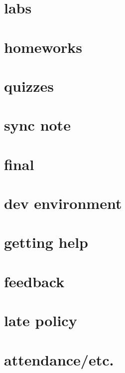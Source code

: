 \section{labs}


\section{homeworks}


\section{quizzes}


\section{sync note}


\section{final}


\section{dev environment}


\section{getting help}


\section{feedback}


\section{late policy}


\section{attendance/etc.}


